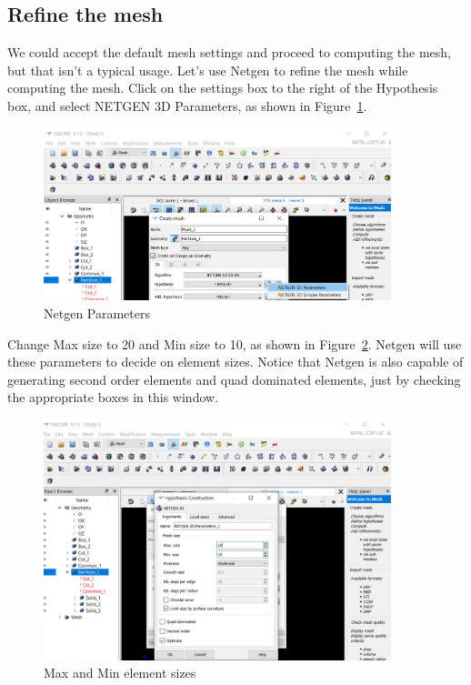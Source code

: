 \subsection{Refine the mesh}

We could accept the default mesh settings and proceed to computing the mesh, but that isn't a typical usage.  Let's use Netgen to refine the mesh while computing the mesh.  Click on the settings box to the right of the Hypothesis box, and select NETGEN 3D Parameters, as shown in Figure~\ref{fg:salome-20}.

\begin{figure}[H]
\centering
\includegraphics[width=0.9\textwidth]{Salome-20}
\caption{Netgen Parameters}\label{fg:salome-20}
\end{figure}

Change Max size to 20 and Min size to 10, as shown in Figure~\ref{fg:salome-21}.  Netgen will use these parameters to decide on element sizes.  Notice that Netgen is also capable of generating second order elements and quad dominated elements, just by checking the appropriate boxes in this window.

\begin{figure}[H]
\centering
\includegraphics[width=0.9\textwidth]{Salome-21}
\caption{Max and Min element sizes}\label{fg:salome-21}
\end{figure}


